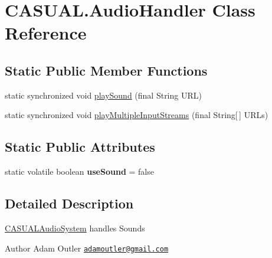\hypertarget{classCASUAL_1_1AudioHandler}{\section{C\-A\-S\-U\-A\-L.\-Audio\-Handler Class Reference}
\label{classCASUAL_1_1AudioHandler}
}
\subsection*{Static Public Member Functions}
\begin{DoxyCompactItemize}
\item 
static synchronized void \hyperlink{classCASUAL_1_1AudioHandler_a920d40dc0a09d356a4d50c0cbc782e97}{play\-Sound} (final String U\-R\-L)
\item 
static synchronized void \hyperlink{classCASUAL_1_1AudioHandler_a4d7f4e40e3410ad7a7ce2ee4852de0da}{play\-Multiple\-Input\-Streams} (final String\mbox{[}$\,$\mbox{]} U\-R\-Ls)
\end{DoxyCompactItemize}
\subsection*{Static Public Attributes}
\begin{DoxyCompactItemize}
\item 
\hypertarget{classCASUAL_1_1AudioHandler_ad7986b266c595310fa3ad7167d690594}{static volatile boolean {\bfseries use\-Sound} = false}\label{classCASUAL_1_1AudioHandler_ad7986b266c595310fa3ad7167d690594}

\end{DoxyCompactItemize}


\subsection{Detailed Description}
\hyperlink{classCASUAL_1_1CASUALAudioSystem}{C\-A\-S\-U\-A\-L\-Audio\-System} handles Sounds

\begin{DoxyAuthor}{Author}
Adam Outler \href{mailto:adamoutler@gmail.com}{\tt adamoutler@gmail.\-com} 
\end{DoxyAuthor}


